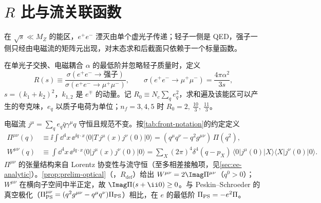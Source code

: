 \section{$R$ 比与流关联函数}\label{sec:ee-R}

在 $\sqrt s\ll M_Z$ 的能区，$e^+e^-$ 湮灭由单个虚光子传递；轻子一侧是 QED，强子一侧只经由电磁流的矩阵元出现，对末态求和后截面只依赖于一个标量函数。

\begin{definition}[$R$ 比]\label{def:ee-R}
在单光子交换、电磁耦合 $\alpha$ 的最低阶并忽略轻子质量时，定义
\begin{equation}\label{eq:ee-Rdef}
R(s)\equiv\frac{\sigma(e^+e^-\to\text{强子})}{\sigma(e^+e^-\to\mu^+\mu^-)},\qquad
\sigma(e^+e^-\to\mu^+\mu^-)=\frac{4\pi\alpha^2}{3s},
\end{equation}
$s=(k_1+k_2)^2$，$k_{1,2}$ 是 $e^\mp$ 的动量。记 $R_0\equiv N_c\sum_qe_q^2$，求和遍及该能区可以产生的夸克味，$e_q$ 以质子电荷为单位；$n_f=3,4,5$ 时 $R_0=2,\ \frac{10}3,\ \frac{11}3$。%
\end{definition}

电磁流 $j^\mu=\sum_qe_q\bar q\gamma^\mu q$ 守恒且规范不变。按\cref{tab:front-notation}的约定定义%
\begin{align}
\Pi^{\mu\nu}(q)&\equiv\ii\!\int\!\dd^4x\,\ee^{\ii q\cdot x}\langle0|T\,j^\mu(x)j^\nu(0)|0\rangle=(q^\mu q^\nu-q^2g^{\mu\nu})\,\Pi(q^2), \label{eq:ee-Pidef}\\
W^{\mu\nu}(q)&\equiv\int\!\dd^4x\,\ee^{\ii q\cdot x}\langle0|j^\mu(x)j^\nu(0)|0\rangle
=\sum_X(2\pi)^4\delta^4(q-p_X)\,\langle0|j^\mu(0)|X\rangle\langle X|j^\nu(0)|0\rangle . \label{eq:ee-Wdef}
\end{align}
$\Pi^{\mu\nu}$ 的张量结构来自 Lorentz 协变性与流守恒（至多相差接触项，见\allowbreak\cref{sec:ee-analytic}）。\cref{prop:prelim-optical}（\tagR，$R_{\mathrm{def}}$）给出 $W^{\mu\nu}=2\Imag\Pi^{\mu\nu}$（$q^0>0$）；$W^{\mu\nu}$ 在横向子空间中半正定，故 $\Imag\Pi(s+\ii0)\ge0$。与 Peskin--Schroeder 的真空极化（$\Pi^{\mu\nu}_{\rm PS}=(q^2g^{\mu\nu}-q^\mu q^\nu)\Pi_{\rm PS}$）相比，在 $e$ 的最低阶 $\Pi_{\rm PS}=-e^2\Pi$。

